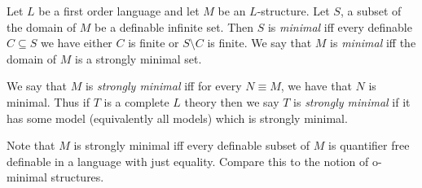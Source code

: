 \documentclass[12pt]{article}
\begin{document}
Let $L$ be a first order language and let $M$ be an $L$-structure. Let $S$, a subset of the domain of $M$ be a definable infinite set. Then $S$ is {\em minimal} iff every definable $C \subseteq S$ we have either $C$ is finite or $S \setminus C$ is finite. We say that $M$ is {\em minimal} iff the domain of $M$ is a strongly minimal set.

\medskip

We say that $M$ is {\em strongly minimal} iff for every $N \equiv M$, we have that $N$ is minimal. Thus if $T$ is a complete $L$ theory then we say $T$ is {\em strongly minimal} if it has some model (equivalently all models) which is strongly minimal.

\medskip

Note that $M$ is strongly minimal iff every definable subset of $M$ is quantifier free definable in a language with just equality. Compare this to the notion of o-minimal structures.
\end{document}
